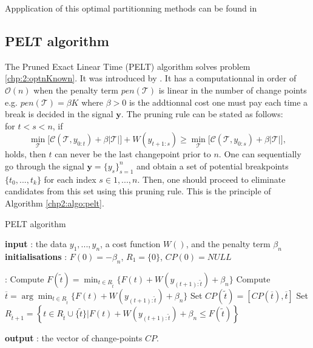 Appplication of this optimal partitionning methods can be found in \cite{rigaill2015pruned,Lavielle1997,perron2006dealing}

\subsection{PELT algorithm}\label{chp2:pelt}

The Pruned Exact Linear Time (PELT) algorithm solves problem \ref{chp:2:optnKnown}. It was introduced by \cite{Killick2012}. It has a computationnal in order of $\mathcal{O}(n)$ when the penalty term $pen(\mathcal{T})$ is linear in the number of change points e.g. $pen(\mathcal{T}) = \beta K$ where $\beta > 0$ is the addtionnal cost one must pay each time a break is decided in the signal $\bm y$. The pruning rule can be stated as follows: \\
for $t<s < n$, if
\begin{equation}\label{chp2:pruning}
 \min_{\mathcal{T}}\bigg[\mathcal{C}(\mathcal{T},y_{0:t})+\beta\lvert \mathcal{T}\rvert\bigg] + W(y_{t+1:s}) \geq \min_{\mathcal{T}}\bigg[\mathcal{C}(\mathcal{T},y_{0:s})+\beta\lvert \mathcal{T}\rvert\bigg], 
\end{equation}
holds, then $t$ can never be the last changepoint prior to $n$.   
One can sequentially go through the signal $\bm y = \{y_s\}_{s=1}^n$ and obtain a set of potential breakpoints $\{t_0,...,t_k\}$ for each index $s \in {1,...,n}$. Then, one should proceed to eliminate candidates from this set using this pruning rule. This is the principle of Algorithm \ref{chp2:algo:pelt}.


\begin{algorithm}[ht]
\caption{PELT algorithm}\label{chp2:algo:pelt}
\begin{algorithmic}

\State \textbf{input} : the data $y_{1},...,y_{n}$, a cost function $W()$, and the penalty term $\beta_{n}$ \\
  
\State \textbf{initialisations} : $F(0)=-\beta_{n}$, $R_{1}=\lbrace 0\rbrace$, $CP(0)=NULL$  
  
 :
  \State Compute 
  $ F(\tilde t)=\min_{t\in R_{\tilde t}}\lbrace F(t)+W(y_{(t+1):\tilde t})+\beta_{n}\rbrace $
  \State Compute $ \overline t=\arg \min_{t\in R_{\tilde t}}\lbrace F(t)+W(y_{(t+1):\tilde t})+\beta_{n}\rbrace $ 
  \State Set $CP(\tilde t)=[CP(\overline t), \overline t]$
  \State Set $R_{\tilde t+1}=\left\{t\in R_{\tilde t}\cup \lbrace\tilde t\rbrace \vert F(t)+W(y_{(t+1):\tilde t}) +\beta_{n} \le F(\tilde t)   \right\}$ 
\EndFor 
   
\State \textbf{output} : the vector of change-points $CP$. 
 
\end{algorithmic}
\end{algorithm} 

